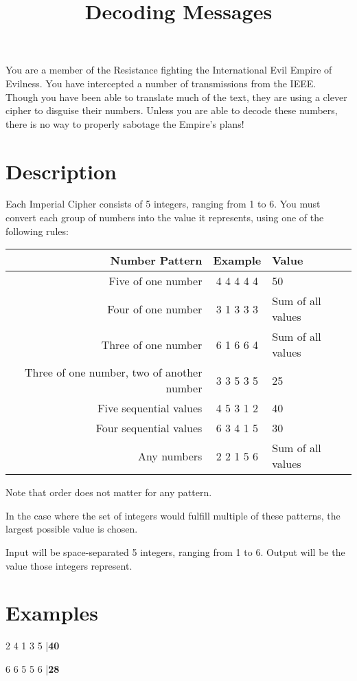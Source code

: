 \documentclass{../codeproblem}
\begin{document}
\title{Decoding Messages}

\begin{flavor}
  You are a member of the Resistance fighting the International Evil Empire of Evilness. You have intercepted a number of transmissions from the IEEE. Though you have been able to translate much of the text, they are using a clever cipher to disguise their numbers. Unless you are able to decode these numbers, there is no way to properly sabotage the Empire's plans!
\end{flavor}

\section*{Description}
Each Imperial Cipher consists of 5 integers, ranging from 1 to 6. You must convert each group of numbers into the value it represents, using one of the following rules:

\begin{center}
\begin{tabular}{| r | c | l |}\hline
  Number Pattern & Example & Value\\\hline
  Five of one number & 4 4 4 4 4 & 50\\\hline
  Four of one number & 3 1 3 3 3 & Sum of all values\\\hline
  Three of one number & 6 1 6 6 4 & Sum of all values\\\hline
  Three of one number, two of another number & 3 3 5 3 5 & 25\\\hline
  Five sequential values & 4 5 3 1 2 & 40\\\hline
  Four sequential values & 6 3 4 1 5 & 30\\\hline
  Any numbers & 2 2 1 5 6 & Sum of all values\\\hline
\end{tabular}
\end{center}

Note that order does not matter for any pattern.

In the case where the set of integers would fulfill multiple of these patterns, the largest possible value is chosen.

Input will be space-separated 5 integers, ranging from 1 to 6. Output will be the value those integers represent.

\section*{Examples}
\begin{example}
2 4 1 3 5
|\textbf{40}\end{example}

\begin{example}
6 6 5 5 6
|\textbf{28}\end{example}
\end{document}
